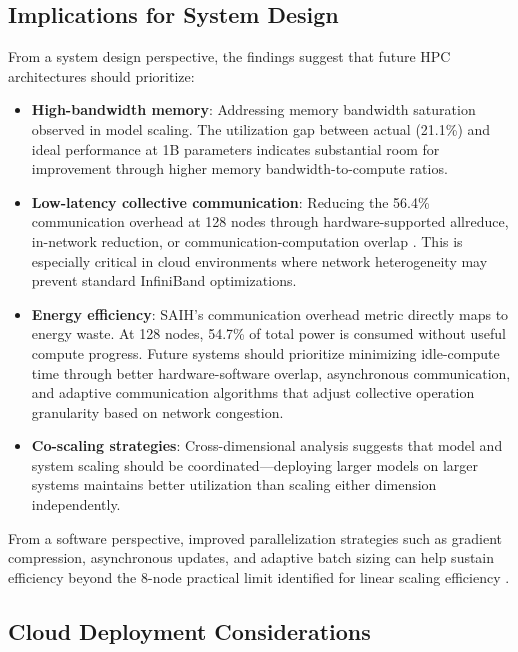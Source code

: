 \documentclass{llncs}
\begin{document}
\subsection{Implications for System Design}

From a system design perspective, the findings suggest that future HPC architectures should prioritize:

\begin{itemize}
    \item \textbf{High-bandwidth memory}: Addressing memory bandwidth saturation observed in model scaling. The utilization gap between actual (21.1\%) and ideal performance at 1B parameters indicates substantial room for improvement through higher memory bandwidth-to-compute ratios.
    \item \textbf{Low-latency collective communication}: Reducing the 56.4\% communication overhead at 128 nodes through hardware-supported allreduce, in-network reduction, or communication-computation overlap \cite{Sergeev2018}. This is especially critical in cloud environments where network heterogeneity may prevent standard InfiniBand optimizations.
    \item \textbf{Energy efficiency}: SAIH's communication overhead metric directly maps to energy waste. At 128 nodes, 54.7\% of total power is consumed without useful compute progress. Future systems should prioritize minimizing idle-compute time through better hardware-software overlap, asynchronous communication, and adaptive communication algorithms that adjust collective operation granularity based on network congestion.
    \item \textbf{Co-scaling strategies}: Cross-dimensional analysis suggests that model and system scaling should be coordinated---deploying larger models on larger systems maintains better utilization than scaling either dimension independently.
\end{itemize}

From a software perspective, improved parallelization strategies such as gradient compression, asynchronous updates, and adaptive batch sizing can help sustain efficiency beyond the 8-node practical limit identified for linear scaling efficiency \cite{Narayanan2019}.

\subsection{Cloud Deployment Considerations}
\end{document}
